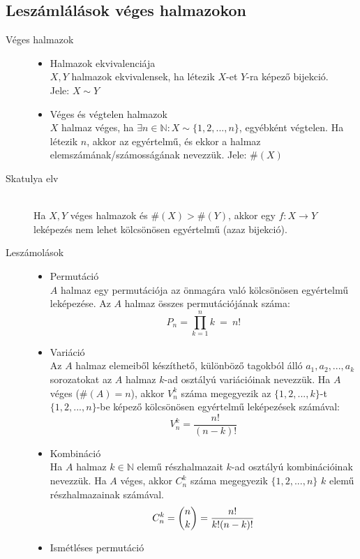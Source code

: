 \documentclass[margin=0px]{article}
\newcommand{\N}{\mathbb{N}}
\begin{document}
		\subsection{Leszámlálások véges halmazokon}
				 \begin{description}
 				 	\item[Véges halmazok] \hfill 
					 	\begin{itemize}
					 		\item Halmazok ekvivalenciája \\
						 		$X,Y$ halmazok ekvivalensek, ha létezik $X$-et $Y$-ra képező bijekció.\\
						 		Jele: $X \sim Y$
					 		\item Véges és végtelen halmazok \\
						 		$X$ halmaz véges, ha $\exists n\in\N : X \sim \{1,2,...,n\}$, egyébként végtelen. Ha létezik $n$, akkor az egyértelmű, és ekkor a halmaz elemszámának/számosságának nevezzük. Jele: $ \#(X)$
					 	\end{itemize}
				 	\item[Skatulya elv] \hfill \\
					 	Ha $X,Y$ véges halmazok és $\#(X) > \#(Y)$, akkor egy $f:X\rightarrow Y$ leképezés nem lehet kölcsönösen egyértelmű (azaz bijekció).
				 	\item[Leszámolások] \hfill
				 	\begin{itemize}
				 		\item Permutáció \\
					 		$A$ halmaz egy permutációja az önmagára való kölcsönösen egyértelmű leképezése. Az $A$ halmaz összes permutációjának száma:
					 		\[P_n = \prod\limits_{k=1}^{n} k \ = \ n!\]
				 		\item Variáció \\
					 		Az $A$ halmaz elemeiből készíthető, különböző tagokból álló $a_1,a_2,...,a_k$ sorozatokat az $A$ halmaz $k$-ad osztályú variációinak nevezzük. Ha $A$ véges ($\#(A) = n$), akkor $V_n^k$ száma megegyezik az $\{1,2,...,k\}$-t $\{1,2,...,n\}$-be képező kölcsönösen egyértelmű leképezések számával:
					 		\[ V_n^k = \frac{n!}{(n-k)!}\]
				 		\item Kombináció \\
					 		Ha $A$ halmaz $k\in\N$ elemű részhalmazait $k$-ad osztályú kombinációinak nevezzük. Ha $A$ véges, akkor $C_n^k$ száma megegyezik $\{1,2,...,n\}$ $k$ elemű részhalmazainak számával.
					 		\[C_n^k = \dbinom{n}{k} = \frac{n!}{k!(n-k)!}\]
				 		\item Ismétléses permutáció \\

\end{itemize}
\end{description}
\end{document}
